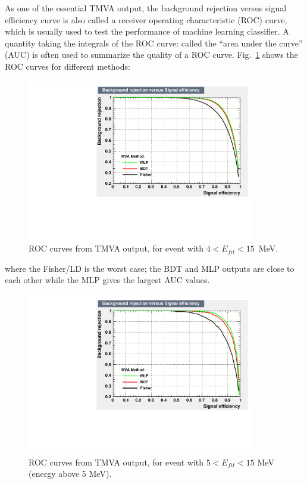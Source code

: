 As one of the essential TMVA output, the background rejection versus signal efficiency curve is also called a receiver operating characteristic (ROC) curve, which is usually used to test the performance of machine learning classifier. A quantity taking the integrals of the ROC curve: called the ``area under the curve'' (AUC) is often used to summarize the quality of a ROC curve\cite{murphy2012machine}.  Fig.~\ref{allE_roc} shows the ROC curves for different methods:
\begin{figure}[!htb]
	\centering
	\includegraphics[width=10cm]{ROC_E4to15.pdf}
	\caption{ROC curves from TMVA output, for event with $4<E_{fit}<15$~MeV.}
	\label{allE_roc}
\end{figure}
where the Fisher/LD is the worst case; the BDT and MLP outputs are close to each other while the MLP gives the largest AUC values.

\begin{figure}[!htb]
	\centering
	\includegraphics[width=10cm]{ROC_E5to15.pdf}
	\caption{ROC curves from TMVA output, for event with $5<E_{fit}<15$ MeV (energy above 5 MeV).}
	\label{E5to15_roc}
\end{figure}

